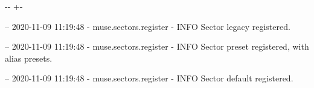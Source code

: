 \documentclass[letterpaper,10pt,english]{sphinxmanual}
\newlength\nbsphinxcodecellspacing
\begin{document}
{

\kern-\sphinxverbatimsmallskipamount\kern-\baselineskip
\kern+\FrameHeightAdjust\kern-\fboxrule
\vspace{\nbsphinxcodecellspacing}

\begin{sphinxVerbatim}[commandchars=\\\{\}]
-- 2020-11-09 11:19:48 - muse.sectors.register - INFO
Sector legacy registered.

-- 2020-11-09 11:19:48 - muse.sectors.register - INFO
Sector preset registered, with alias presets.

-- 2020-11-09 11:19:48 - muse.sectors.register - INFO
Sector default registered.

\end{sphinxVerbatim}
}
\end{document}

